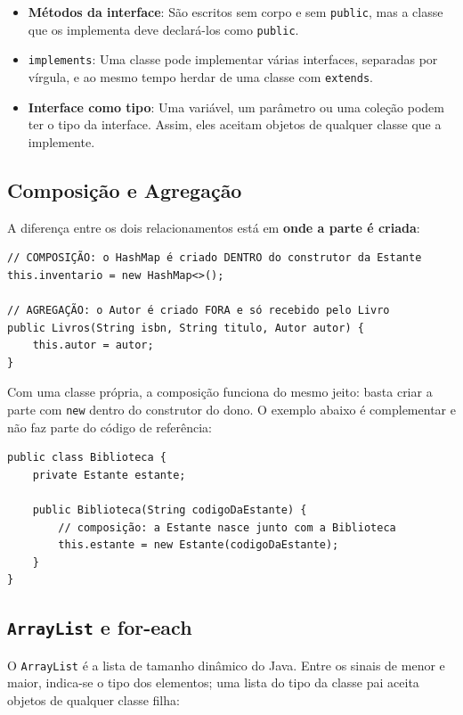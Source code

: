 \begin{itemize}
    \item \textbf{Métodos da interface}: São escritos sem corpo e sem \texttt{public}, mas a
    classe que os implementa deve declará-los como \texttt{public}.

    \item \texttt{implements}: Uma classe pode implementar várias interfaces, separadas por
    vírgula, e ao mesmo tempo herdar de uma classe com \texttt{extends}.

    \item \textbf{Interface como tipo}: Uma variável, um parâmetro ou uma coleção podem ter o
    tipo da interface. Assim, eles aceitam objetos de qualquer classe que a implemente.
\end{itemize}

\subsection{Composição e Agregação}

A diferença entre os dois relacionamentos está em \textbf{onde a parte é criada}:

\begin{lstlisting}[style=java]
// COMPOSIÇÃO: o HashMap é criado DENTRO do construtor da Estante
this.inventario = new HashMap<>();

// AGREGAÇÃO: o Autor é criado FORA e só recebido pelo Livro
public Livros(String isbn, String titulo, Autor autor) {
    this.autor = autor;
}
\end{lstlisting}

Com uma classe própria, a composição funciona do mesmo jeito: basta criar a parte com
\texttt{new} dentro do construtor do dono. O exemplo abaixo é complementar e não faz parte do
código de referência:

\begin{lstlisting}[style=java]
public class Biblioteca {
    private Estante estante;

    public Biblioteca(String codigoDaEstante) {
        // composição: a Estante nasce junto com a Biblioteca
        this.estante = new Estante(codigoDaEstante);
    }
}
\end{lstlisting}

\subsection{\texttt{ArrayList} e for-each}

O \texttt{ArrayList} é a lista de tamanho dinâmico do Java. Entre os sinais de menor e maior,
indica-se o tipo dos elementos; uma lista do tipo da classe pai aceita objetos de qualquer
classe filha:

